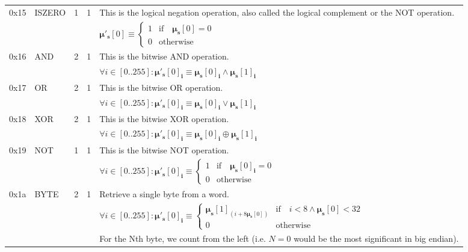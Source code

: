 \documentclass[9pt,oneside]{amsart}
\begin{document}
\begin{tabularx}{\textwidth}{rlrrX}
\midrule
0x15 & {\small ISZERO} & 1 & 1 & This is the logical negation operation, also called the logical complement or the NOT operation. \\
&&&& $\boldsymbol{\mu}'_\mathbf{s}[0] \equiv \begin{cases} 1 & \text{if} \quad \boldsymbol{\mu}_\mathbf{s}[0] = 0 \\ 0 & \text{otherwise} \end{cases}$ \\
\midrule
0x16 & {\small AND} & 2 & 1 & This is the bitwise AND operation. \\
&&&& $\forall i \in [0..255]: \boldsymbol{\mu}'_\mathbf{s}[0]_\mathbf{i} \equiv \boldsymbol{\mu}_\mathbf{s}[0]_\mathbf{i} \wedge \boldsymbol{\mu}_\mathbf{s}[1]_\mathbf{i}$ \\
\midrule
0x17 & {\small OR} & 2 & 1 & This is the bitwise OR operation. \\
&&&& $\forall i \in [0..255]: \boldsymbol{\mu}'_\mathbf{s}[0]_\mathbf{i} \equiv \boldsymbol{\mu}_\mathbf{s}[0]_\mathbf{i} \vee \boldsymbol{\mu}_\mathbf{s}[1]_\mathbf{i}$ \\
\midrule
0x18 & {\small XOR} & 2 & 1 & This is the bitwise XOR operation. \\
&&&& $\forall i \in [0..255]: \boldsymbol{\mu}'_\mathbf{s}[0]_\mathbf{i} \equiv \boldsymbol{\mu}_\mathbf{s}[0]_\mathbf{i} \oplus \boldsymbol{\mu}_\mathbf{s}[1]_\mathbf{i}$ \\
\midrule
0x19 & {\small NOT} & 1 & 1 & This is the bitwise NOT operation. \\
&&&& $\forall i \in [0..255]: \boldsymbol{\mu}'_\mathbf{s}[0]_\mathbf{i} \equiv \begin{cases} 1 & \text{if} \quad \boldsymbol{\mu}_\mathbf{s}[0]_\mathbf{i} = 0 \\ 0 & \text{otherwise} \end{cases}$ \\
\midrule
0x1a & {\small BYTE} & 2 & 1 & Retrieve a single byte from a word. \\
&&&& $\forall i \in [0..255]: \boldsymbol{\mu}'_\mathbf{s}[0]_\mathbf{i} \equiv \begin{cases} \boldsymbol{\mu}_\mathbf{s}[1]_{(i + 8\boldsymbol{\mu}_\mathbf{s}[0])} & \text{if} \quad i < 8 \wedge \boldsymbol{\mu}_\mathbf{s}[0] < 32 \\ 0 & \text{otherwise} \end{cases} $\\
&&&& For the Nth byte, we count from the left (i.e. $N=0$ would be the most significant in big endian). \\
\bottomrule
\end{tabularx}
\end{document}
